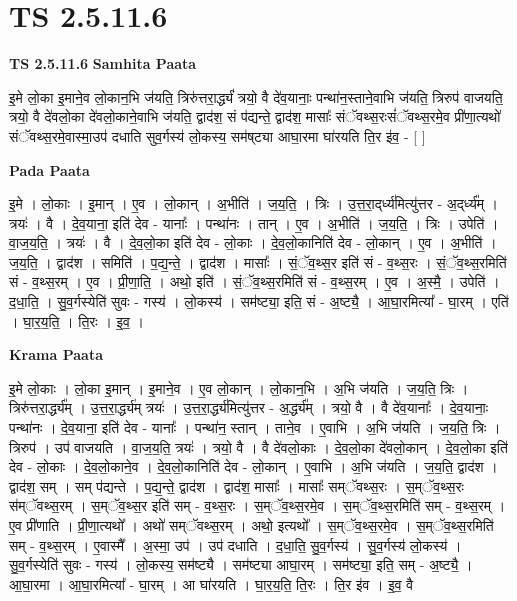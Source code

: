 \documentclass[17pt]{extarticle}
\begin{document}
\section{ TS 2.5.11.6 }

\textbf{TS 2.5.11.6 } \newline
\textbf{Samhita Paata} \newline

इ॒मे लो॒का इ॒माने॒व लो॒कान॒भि ज॑यति॒ त्रिरु॑त्तरा॒र्द्ध्यं॑ त्रयो॒ वै दे॑व॒यानाः॒ पन्था॑न॒स्ताने॒वाभि ज॑यति॒ त्रिरुप॑ वाजयति॒ त्रयो॒ वै दे॑वलो॒का दे॑वलो॒काने॒वाभि ज॑यति॒ द्वाद॑श॒ सं प॑द्यन्ते॒ द्वाद॑श॒ मासाः᳚ संॅवथ्स॒रःसं॑ॅवथ्स॒रमे॒व प्री॑णा॒त्यथो॑ संॅवथ्स॒रमे॒वास्मा॒उप॑ दधाति सुव॒र्गस्य॑ लो॒कस्य॒ सम॑ष्‌ट्या आघा॒रमा घा॑रयति ति॒र इ॑व॒ - [  ] \newline

\textbf{Pada Paata} \newline

इ॒मे । लो॒काः । इ॒मान् । ए॒व । लो॒कान् । अ॒भीति॑ । ज॒य॒ति॒ । त्रिः । उ॒त्त॒रा॒द्‌र्ध्य॑मित्यु॑त्तर - अ॒द्‌र्ध्य᳚म् । त्रयः॑ । वै । दे॒व॒याना॒ इति॑ देव - यानाः᳚ । पन्था॑नः । तान् । ए॒व । अ॒भीति॑ । ज॒य॒ति॒ । त्रिः । उपेति॑ । वा॒ज॒य॒ति॒ । त्रयः॑ । वै । दे॒व॒लो॒का इति॑ देव - लो॒काः । दे॒व॒लो॒कानिति॑ देव - लो॒कान् । ए॒व । अ॒भीति॑ । ज॒य॒ति॒ । द्वाद॑श । समिति॑ । प॒द्य॒न्ते॒ । द्वाद॑श । मासाः᳚ । सं॒ॅव॒थ्स॒र इति॑ सं - व॒थ्स॒रः । सं॒ॅव॒थ्स॒रमिति॑ सं - व॒थ्स॒रम् । ए॒व । प्री॒णा॒ति॒ । अथो॒ इति॑ । सं॒ॅव॒थ्स॒रमिति॑ सं - व॒थ्स॒रम् । ए॒व । अ॒स्मै॒ । उपेति॑ । द॒धा॒ति॒ । सु॒व॒र्गस्येति॑ सुवः - गस्य॑ । लो॒कस्य॑ । सम॑ष्ट्या॒ इति॒ सं - अ॒ष्ट्यै॒ । आ॒घा॒रमित्या᳚ - घा॒रम् । एति॑ । घा॒र॒य॒ति॒ । ति॒रः । इ॒व॒ ।  \newline


\textbf{Krama Paata} \newline

इ॒मे लो॒काः । लो॒का इ॒मान् । इ॒माने॒व । ए॒व लो॒कान् । लो॒कान॒भि । अ॒भि ज॑यति । ज॒य॒ति॒ त्रिः । त्रिरु॑त्तरा॒र्द्ध्य᳚म् । उ॒त्त॒रा॒र्द्ध्य॑म् त्रयः॑ । उ॒त्त॒रा॒र्द्ध्य॑मित्यु॑त्तर - अ॒र्द्ध्य᳚म् । त्रयो॒ वै । वै दे॑व॒यानाः᳚ । दे॒व॒यानाः॒ पन्था॑नः । दे॒व॒याना॒ इति॑ देव - यानाः᳚ । पन्था॑न॒ स्तान् । ताने॒व । ए॒वाभि । अ॒भि ज॑यति । ज॒य॒ति॒ त्रिः । त्रिरुप॑ । उप॑ वाजयति । वा॒ज॒य॒ति॒ त्रयः॑ । त्रयो॒ वै । वै दे॑वलो॒काः । दे॒व॒लो॒का दे॑वलो॒कान् । दे॒व॒लो॒का इति॑ देव - लो॒काः । दे॒व॒लो॒काने॒व । दे॒व॒लो॒कानिति॑ देव - लो॒कान् । ए॒वाभि । अ॒भि ज॑यति । ज॒य॒ति॒ द्वाद॑श । द्वाद॑श॒ सम् । सम् प॑द्यन्ते । प॒द्य॒न्ते॒ द्वाद॑श । द्वाद॑श॒ मासाः᳚ । मासाः᳚ सम्ॅवथ्स॒रः । स॒म्ॅव॒थ्स॒रः स॑म्ॅवथ्स॒रम् । स॒म्ॅव॒थ्स॒र इति॑ सम् - व॒थ्स॒रः । स॒म्ॅव॒थ्स॒रमे॒व । स॒म्ॅव॒थ्स॒रमिति॑ सम् - व॒थ्स॒रम् । ए॒व प्री॑णाति । प्री॒णा॒त्यथो᳚ । अथो॑ सम्ॅवथ्स॒रम् । अथो॒ इत्यथो᳚ । स॒म्ॅव॒थ्स॒रमे॒व । स॒म्ॅव॒थ्स॒रमिति॑ सम् - व॒थ्स॒रम् । ए॒वास्मै᳚ । अ॒स्मा॒ उप॑ । उप॑ दधाति । द॒धा॒ति॒ सु॒व॒र्गस्य॑ । सु॒व॒र्गस्य॑ लो॒कस्य॑ । सु॒व॒र्गस्येति॑ सुवः - गस्य॑ । लो॒कस्य॒ सम॑ष्ट्यै । सम॑ष्ट्या आघा॒रम् । सम॑ष्ट्या॒ इति॒ सम् - अ॒ष्ट्यै॒ । आ॒घा॒रमा । आ॒घा॒रमित्या᳚ - घा॒रम् । आ घा॑रयति । घा॒र॒य॒ति॒ ति॒रः । ति॒र इ॑व । इ॒व॒ वै \newline
\end{document}
